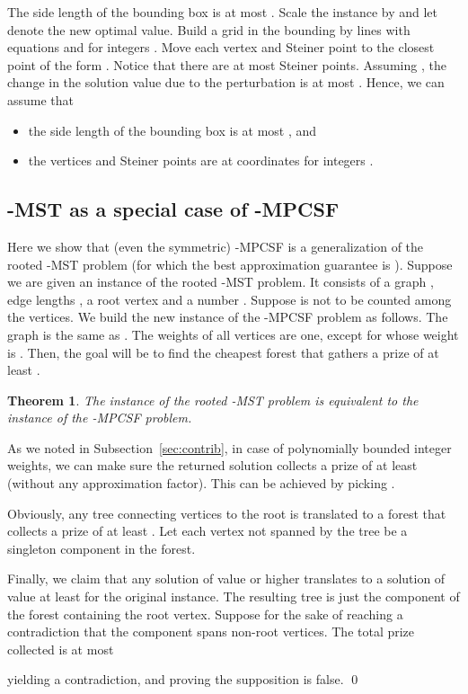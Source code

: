 \documentclass[extras,11pt]{article} \usepackage{fullpage}
\theoremstyle{mytheorem}
\newtheorem{theorem}{Theorem}
\renewenvironment{proof}{\par\noindent{\bf Proof.}\hspace{0.5em}}
    {\hfill\qed\vspace{1ex}}
\begin{document}
The side length of the bounding box is at most .
Scale the instance by  and let  denote the new optimal value.
Build a grid in the bounding by lines with equations  and  for integers .
Move each vertex and Steiner point to the closest point of the form .
Notice that there are at most  Steiner points.
Assuming , the change in the solution value
due to the perturbation is at most .
Hence, we can assume that
\begin{itemize}\setlength{\itemsep}{-.01in}
\item the side length of the bounding box is at most , and
\item the vertices and Steiner points are at coordinates  for integers .
\end{itemize}





\subsection{-MST as a special case of -MPCSF}\label{sec:kmst}
Here we show that (even the symmetric) -MPCSF is a generalization of the rooted -MST problem (for which the best approximation guarantee is ).
Suppose we are given an instance  of the rooted -MST problem.
It consists of a graph , edge lengths , a root vertex  and a number .
Suppose  is not to be counted among the  vertices.
We build the new instance  of the -MPCSF problem as follows.
The graph  is the same as .
The weights of all vertices are one, except for  whose weight is .
Then, the goal will be to find the cheapest forest that gathers a prize of at least .

\begin{theorem}\label{thm:special-case}
The instance  of the rooted -MST problem
is equivalent to
the instance  of the -MPCSF problem.
\end{theorem}
\begin{proof}
As we noted in Subsection~\ref{sec:contrib},
in case of polynomially bounded integer weights,
we can make sure the returned solution collects a prize of at least  (without any approximation factor).
This can be achieved by picking .

Obviously, any tree connecting  vertices to the root is translated
to a forest that collects a prize of at least .
Let each vertex not spanned by the tree be a singleton component in the forest.

Finally, we claim that any solution of value  or higher translates to a solution of value at least  for the original instance.
The resulting tree is just the component of the forest containing the root vertex.
Suppose for the sake of reaching a contradiction that the component spans  non-root vertices.
The total prize collected is at most

yielding a contradiction, and proving the supposition is false.
\end{proof}
\end{document}
